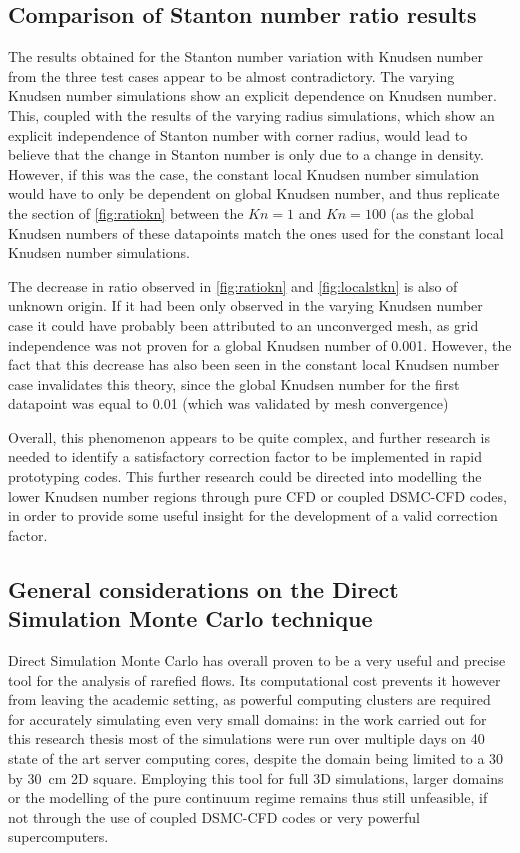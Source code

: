 \subsection{Comparison of Stanton number ratio results}
\label{subsection:comparison}
The results obtained for the Stanton number variation with Knudsen number from the three test cases appear to be almost contradictory. The varying Knudsen number simulations show an explicit dependence on Knudsen number. This, coupled with the results of the varying radius simulations, which show an explicit independence of Stanton number with corner radius, would lead to believe that the change in Stanton number is only due to a change in density. However, if this was the case, the constant local Knudsen number simulation would have to only be dependent on global Knudsen number, and thus replicate the section of \autoref{fig:ratiokn} between the $Kn = 1$ and $Kn = 100$ (as the global Knudsen numbers of these datapoints match the ones used for the constant local Knudsen number simulations.

The decrease in ratio observed in \autoref{fig:ratiokn} and \autoref{fig:localstkn} is also of unknown origin. If it had been only observed in the varying Knudsen number case it could have probably been attributed to an unconverged mesh, as grid independence was not proven for a global Knudsen number of 0.001. However, the fact that this decrease has also been seen in the constant local Knudsen number case invalidates this theory, since the global Knudsen number for the first datapoint was equal to 0.01 (which was validated by mesh convergence)

Overall, this phenomenon appears to be quite complex, and further research is needed to identify a satisfactory correction factor to be implemented in rapid prototyping codes. This further research could be directed into modelling the lower Knudsen number regions through pure CFD or coupled DSMC-CFD codes, in order to provide some useful insight for the development of a valid correction factor.

\subsection{General considerations on the Direct Simulation Monte Carlo technique}
\label{subsection:dsmcdisc}
Direct Simulation Monte Carlo has overall proven to be a very useful and precise tool for the analysis of rarefied flows. Its computational cost prevents it however from leaving the academic setting, as powerful computing clusters are required for accurately simulating even very small domains: in the work carried out for this research thesis most of the simulations were run over multiple days on 40 state of the art server computing cores, despite the domain being limited to a 30 by \qty{30}{\cm} 2D square.
Employing this tool for full 3D simulations, larger domains or the modelling of the pure continuum regime remains thus still unfeasible, if not through the use of coupled DSMC-CFD codes or very powerful supercomputers.